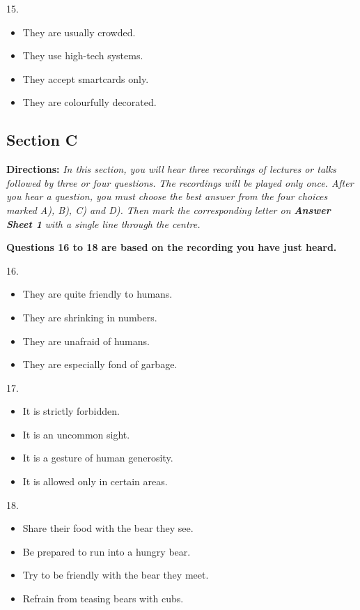 \documentclass[UTF8,11pt]{ctexart}
\begin{document}
15.


\begin{itemize}[leftmargin=2em,itemsep=.2em,topsep=.4em]\item[A.] They are usually crowded.
\item[B.] They use high-tech systems.
\item[C.] They accept smartcards only.
\item[D.] They are colourfully decorated.
\end{itemize}

\subsection*{\textbf{Section C}}


\textbf{Directions:}\textit{ In this section, you will hear three recordings of lectures or talks followed by three or four questions.} \textit{The recordings will be played only once. After you hear a question, you must choose the best answer from the four} \textit{choices marked A), B), C) and D). Then mark the corresponding letter on }\textbf{\textit{Answer Sheet 1}}\textit{ with a single line through} \textit{the centre.}


\textbf{Questions 16 to 18 are based on the recording you have just heard.}


16.


\begin{itemize}[leftmargin=2em,itemsep=.2em,topsep=.4em]\item[A.] They are quite friendly to humans.
\item[B.] They are shrinking in numbers.
\item[C.] They are unafraid of humans.
\item[D.] They are especially fond of garbage.
\end{itemize}

17.


\begin{itemize}[leftmargin=2em,itemsep=.2em,topsep=.4em]\item[A.] It is strictly forbidden.
\item[B.] It is an uncommon sight.
\item[C.] It is a gesture of human generosity.
\item[D.] It is allowed only in certain areas.
\end{itemize}

18.


\begin{itemize}[leftmargin=2em,itemsep=.2em,topsep=.4em]\item[A.] Share their food with the bear they see.
\item[B.] Be prepared to run into a hungry bear.
\item[C.] Try to be friendly with the bear they meet.
\item[D.] Refrain from teasing bears with cubs.
\end{itemize}
\end{document}
